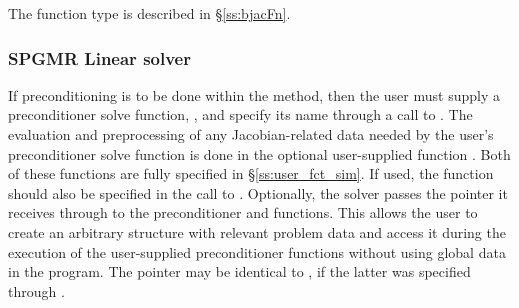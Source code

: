 {{  The function type  is described in \S\ref{ss:bjacFn}.
}
\subsubsection{SPGMR Linear solver}\label{sss:optin_spgmr}
If preconditioning is to be done within the {\spgmr} method, then the user
must supply a preconditioner solve function, , and specify its
name through a call to .
The evaluation and preprocessing of any Jacobian-related data needed
by the user's preconditioner solve function is done in the optional
user-supplied function . Both of these functions are
fully specified in \S\ref{ss:user_fct_sim}.
If used, the  function should also be specified in the call to
.
Optionally, the {\idaspgmr} solver passes the pointer  it receives
through  to the preconditioner  and
 functions.  
This allows the user to create an arbitrary structure with relevant problem data 
and access it during the execution of the user-supplied preconditioner functions
without using global data in the program.  
The pointer  may be identical to , if the latter was 
specified through .

}
